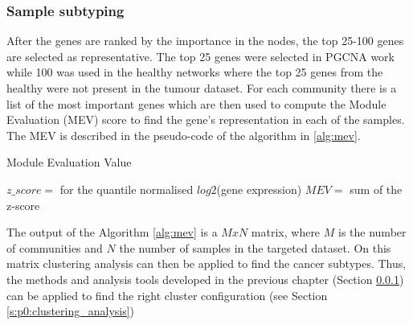 \subsubsection{Sample subtyping}

After the genes are ranked by the importance in the nodes, the top 25-100 genes are selected as representative. The top 25 genes were selected in PGCNA work \cite{Care2019-ij} while 100 was used in the healthy networks where the top 25 genes from the healthy were not present in the tumour dataset. For each community there is a list of the most important genes which are then used to compute the Module Evaluation (MEV) score \citet{Care2019-ij} to find the gene's representation in each of the samples. The MEV is described in the pseudo-code of the algorithm in \ref{alg:mev}.

\begin{algorithm}
\caption{Module Evaluation Value }\label{alg:mev}
    \begin{algorithmic}
            \State $z\_score=$ for the quantile normalised $log2$(gene expression)
                \State $MEV=$ sum of the z-score  
            \EndFor
        \EndFor
    \EndFor
    \end{algorithmic}
\end{algorithm}

The output of the Algorithm \ref{alg:mev} is a $MxN$ matrix, where $M$ is the number of communities and $N$ the number of samples in the targeted dataset. On this matrix clustering analysis can then be applied to find the cancer subtypes. Thus, the methods and analysis tools developed in the previous chapter (Section \ref{}) can be applied to find the right cluster configuration (see Section \ref{s:p0:clustering_analysis})
